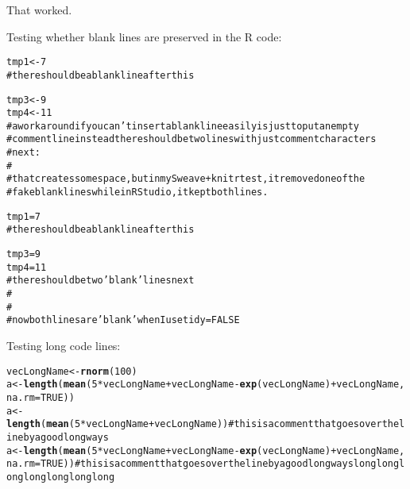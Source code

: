 \documentclass{article}\usepackage{graphicx, color}
\makeatletter
\newcommand{\hlfunctioncall}[1]{\textcolor[rgb]{0.501960784313725,0,0.329411764705882}{\textbf{#1}}}%
\newcommand{\hlcomment}[1]{\textcolor[rgb]{0.180392156862745,0.6,0.341176470588235}{#1}}%
\newenvironment{kframe}{%
 \def\at@end@of@kframe{}%
 \ifinner\ifhmode%
  \def\at@end@of@kframe{\end{minipage}}%
  \begin{minipage}{\columnwidth}%
 \fi\fi%
 \def\FrameCommand##1{\hskip\@totalleftmargin \hskip-\fboxsep
 \colorbox{shadecolor}{##1}\hskip-\fboxsep
     \hskip-\linewidth \hskip-\@totalleftmargin \hskip\columnwidth}%
 \MakeFramed {\advance\hsize-\width
   \@totalleftmargin\z@ \linewidth\hsize
   \@setminipage}}%
 {\par\unskip\endMakeFramed%
 \at@end@of@kframe}
\newenvironment{knitrout}{}{} %
\makeatother
\begin{document}
That worked.

Testing whether blank lines are preserved in the R code:

\begin{knitrout}
\color{fgcolor}\begin{kframe}
\begin{alltt}
tmp1 <- 7
\hlcomment{# there should be a blank line after this}

tmp3 <- 9
tmp4 <- 11
\hlcomment{# a work around if you can't insert a blank line easily is just to put an empty}
\hlcomment{# comment line instead there should be two lines with just comment characters}
\hlcomment{# next:}
\hlcomment{# }
\hlcomment{# that creates some space, but in my Sweave+knitr test, it removed one of the}
\hlcomment{# fake blank lines while in RStudio, it kept both lines.}
\end{alltt}
\end{kframe}
\end{knitrout}


\begin{knitrout}
\color{fgcolor}\begin{kframe}
\begin{alltt}
tmp1 = 7
\hlcomment{# there should be a blank line after this}

tmp3 = 9
tmp4 = 11
\hlcomment{# there should be two 'blank' lines next}
\hlcomment{#}
\hlcomment{#}
\hlcomment{# now both lines are 'blank' when I use tidy=FALSE }
\end{alltt}
\end{kframe}
\end{knitrout}


Testing long code lines:

\begin{knitrout}
\color{fgcolor}\begin{kframe}
\begin{alltt}
vecLongName <- \hlfunctioncall{rnorm}(100)
a <- \hlfunctioncall{length}(\hlfunctioncall{mean}(5 * vecLongName + vecLongName - \hlfunctioncall{exp}(vecLongName) + vecLongName, 
    na.rm = TRUE))
a <- \hlfunctioncall{length}(\hlfunctioncall{mean}(5 * vecLongName + vecLongName))  \hlcomment{# this is a comment that goes over the line by a good long ways}
a <- \hlfunctioncall{length}(\hlfunctioncall{mean}(5 * vecLongName + vecLongName - \hlfunctioncall{exp}(vecLongName) + vecLongName, 
    na.rm = TRUE))  \hlcomment{# this is a comment that goes over the line by a good long ways long long long long long long long}
\end{alltt}
\end{kframe}
\end{knitrout}
\end{document}
